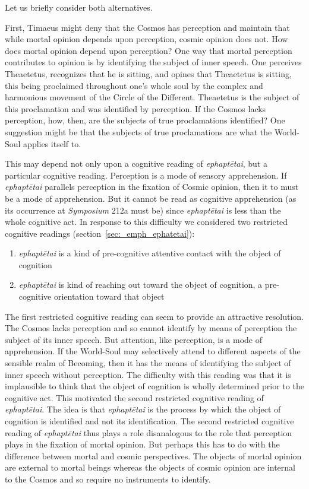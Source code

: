 Let us briefly consider both alternatives.

First, Timaeus might deny that the Cosmos has perception and maintain that while mortal opinion depends upon perception, cosmic opinion does not. How does mortal opinion depend upon perception? One way that mortal perception contributes to opinion is by identifying the subject of inner speech. One perceives Theaetetus, recognizes that he is sitting, and opines that Theaetetus is sitting, this being proclaimed throughout one's whole soul by the complex and harmonious movement of the Circle of the Different. Theaetetus is the subject of this proclamation and was identified by perception. If the Cosmos lacks perception, how, then, are the subjects of true proclamations identified? One suggestion might be that the subjects of true proclamations are what the World-Soul applies itself to. 

This may depend not only upon a cognitive reading of \emph{ephaptētai}, but a particular cognitive reading. Perception is a mode of sensory apprehension. If \emph{ephaptētai} parallels perception in the fixation of Cosmic opinion, then it to must be a mode of apprehension. But it cannot be read as cognitive apprehension (as its occurrence at \emph{Symposium} 212a must be) since \emph{ephaptētai} is less than the whole cognitive act. In response to this difficulty we considered two restricted cognitive readings (section~\ref{sec:_emph_ephatetai}):
\begin{enumerate}[(1)]
	\item \emph{ephaptētai} is a kind of pre-cognitive attentive contact with the object of cognition
	\item \emph{ephaptētai} is kind of reaching out toward the object of cognition, a pre-cognitive orientation toward that object
\end{enumerate}
The first restricted cognitive reading can seem to provide an attractive resolution. The Cosmos lacks perception and so cannot identify by means of perception the subject of its inner speech. But attention, like perception, is a mode of apprehension. If the World-Soul may selectively attend to different aspects of the sensible realm of Becoming, then it has the means of identifying the subject of inner speech without perception. The difficulty with this reading was that it is implausible to think that the object of cognition is wholly determined prior to the cognitive act. This motivated the second restricted cognitive reading of \emph{ephaptētai}. The idea is that \emph{ephaptētai} is the process by which the object of cognition is identified and not its identification. The second restricted cognitive reading of \emph{ephaptētai} thus plays a role disanalogous to the role that perception plays in the fixation of mortal opinion. But perhaps this has to do with the difference between mortal and cosmic perspectives. The objects of mortal opinion are external to mortal beings whereas the objects of cosmic opinion are internal to the Cosmos and so require no instruments to identify. 

